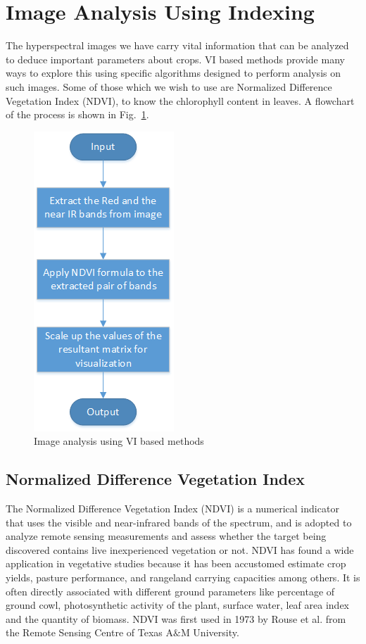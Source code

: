 \section{Image Analysis Using Indexing}

The hyperspectral images we have carry vital information that can be analyzed to deduce important parameters about crops. VI based methods provide many ways to explore this using specific algorithms designed to perform analysis on such images. Some of those which we wish to use are Normalized Difference Vegetation Index (NDVI), to know the chlorophyll content in leaves. A flowchart of the process is shown in Fig.~\ref{fig: extra-10}.

\begin{figure}[h]
	\includegraphics[height=0.9\linewidth]{extra-10}
	\centering
	\caption{\label{fig: extra-10}Image analysis using VI based methods}
\end{figure}


\subsection{Normalized Difference Vegetation Index}

The Normalized Difference Vegetation Index (NDVI) is a numerical indicator that uses the visible and near-infrared bands of the spectrum, and is adopted to analyze remote sensing measurements and assess whether the target being discovered contains live inexperienced vegetation or not. NDVI has found a wide application in vegetative studies because it has been accustomed estimate crop yields, pasture performance, and rangeland carrying capacities among others. It is often directly associated with different ground parameters like percentage of ground cowl, photosynthetic activity of the plant, surface water, leaf  area index and the quantity of biomass. NDVI was first used in 1973 by Rouse et al. from the Remote Sensing Centre of Texas A$\&$M University.

